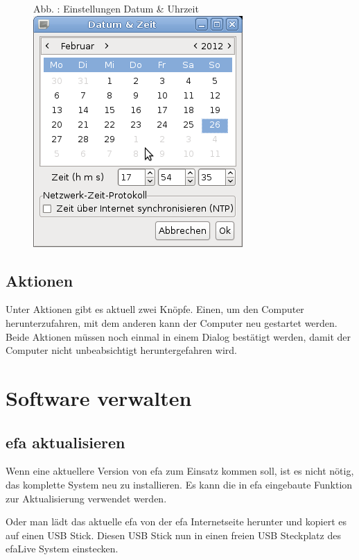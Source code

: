 \documentclass[a4paper,12pt,twoside]{article}
\newcounter{Abb}
\renewcommand\theAbb{\arabic{Abb}}
\begin{document}
\begin{figure}
\centering
\begin{minipage}{6.59cm}
Abb. \stepcounter{Abb}{\theAbb}: Einstellungen Datum \& Uhrzeit
\includegraphics[width=7.99cm,height=8.811cm]{efaLivede-img/efaLivede-img25.png}\end{minipage}
\end{figure}

\bigskip

\subsection[Aktionen]{Aktionen}
Unter Aktionen gibt es aktuell zwei Knöpfe. Einen, um den Computer
herunterzufahren, mit dem anderen kann der Computer neu gestartet
werden. Beide Aktionen müssen noch einmal in einem Dialog bestätigt
werden, damit der Computer nicht unbeabsichtigt heruntergefahren wird.


\bigskip

\section{Software verwalten}
\subsection{efa aktualisieren}
Wenn eine aktuellere Version von efa zum Einsatz kommen soll, ist es
nicht nötig, das komplette System neu zu installieren. Es kann die in
efa eingebaute Funktion zur Aktualisierung verwendet werden. 

Oder man lädt das aktuelle efa von der efa Internetseite \cite{EFA1}
herunter und kopiert es auf einen USB Stick. Diesen USB Stick nun in
einen freien USB Steckplatz des efaLive System einstecken. 
\end{document}
